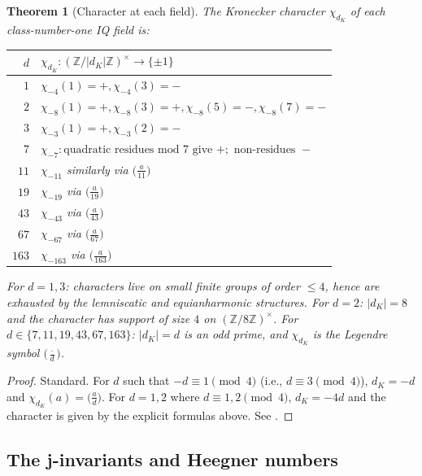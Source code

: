 \documentclass[11pt]{amsart}
\theoremstyle{plain}
\newtheorem{theorem}{Theorem}[section]
\theoremstyle{definition}
\theoremstyle{remark}
\newcommand{\Z}{\mathbb{Z}}
\begin{document}
\begin{theorem}[Character at each field]\label{thm:characters}
The Kronecker character $\chi_{d_K}$ of each class-number-one IQ field is:
\begin{center}
\renewcommand{\arraystretch}{1.15}
\begin{tabular}{rl}
\toprule
$d$ & $\chi_{d_K}: (\Z/|d_K|\Z)^{\times} \to \{\pm 1\}$ \\
\midrule
$1$   & $\chi_{-4}(1)=+, \chi_{-4}(3)=-$ \\
$2$   & $\chi_{-8}(1)=+, \chi_{-8}(3)=+, \chi_{-8}(5)=-, \chi_{-8}(7)=-$ \\
$3$   & $\chi_{-3}(1)=+, \chi_{-3}(2)=-$ \\
$7$   & $\chi_{-7}: \text{quadratic residues mod 7 give } +; \text{ non-residues } -$ \\
$11$  & $\chi_{-11}$ similarly via $\bigl(\frac{a}{11}\bigr)$ \\
$19$  & $\chi_{-19}$ via $\bigl(\frac{a}{19}\bigr)$ \\
$43$  & $\chi_{-43}$ via $\bigl(\frac{a}{43}\bigr)$ \\
$67$  & $\chi_{-67}$ via $\bigl(\frac{a}{67}\bigr)$ \\
$163$ & $\chi_{-163}$ via $\bigl(\frac{a}{163}\bigr)$ \\
\bottomrule
\end{tabular}
\end{center}
For $d = 1, 3$: characters live on small finite groups of order $\leq 4$,
hence are exhausted by the lemniscatic and equianharmonic structures.
For $d = 2$: $|d_K| = 8$ and the character has support of size $4$ on
$(\Z/8\Z)^{\times}$. For $d \in \{7, 11, 19, 43, 67, 163\}$: $|d_K| = d$
is an odd prime, and $\chi_{d_K}$ is the Legendre symbol
$\bigl(\frac{\cdot}{d}\bigr)$.
\end{theorem}

\begin{proof}
Standard. For $d$ such that $-d \equiv 1 \pmod 4$ (i.e., $d \equiv 3 \pmod 4$),
$d_K = -d$ and $\chi_{d_K}(a) = \bigl(\frac{a}{d}\bigr)$. For $d = 1, 2$
where $d \equiv 1, 2 \pmod 4$, $d_K = -4d$ and the character is given by
the explicit formulas above. See \cite[\S{}11]{cohen-NT-vol-1}.
\end{proof}

\subsection{The j-invariants and Heegner numbers}
\end{document}
